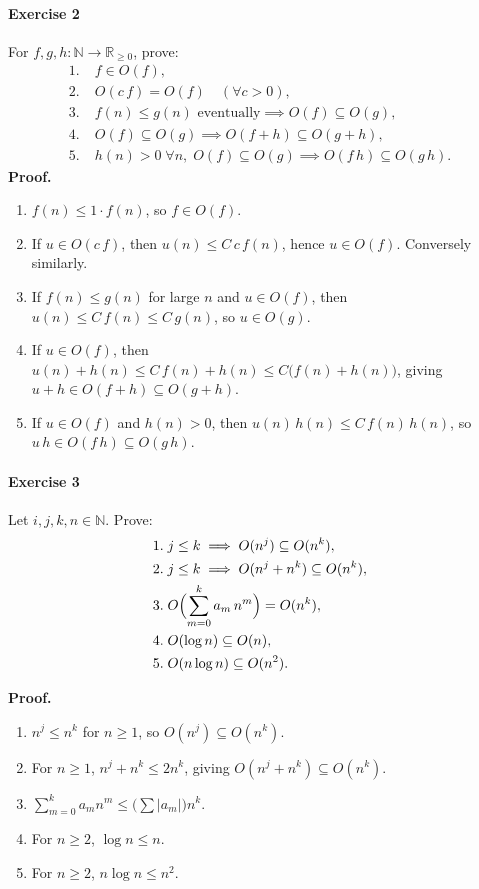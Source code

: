 \documentclass{article}
\theoremstyle{theorem}
\theoremstyle{definition}
\theoremstyle{remark}
\begin{document}
\paragraph*{Exercise 2}
For \(f,g,h\colon\mathbb N\to\mathbb R_{\ge0}\), prove:
\[
\begin{aligned}
1.\;&f\in O(f),\\
2.\;&O(c\,f)=O(f)\quad(\forall c>0),\\
3.\;&f(n)\le g(n)\text{ eventually}\implies O(f)\subseteq O(g),\\
4.\;&O(f)\subseteq O(g)\implies O(f+h)\subseteq O(g+h),\\
5.\;&h(n)>0\;\forall n,\;O(f)\subseteq O(g)\implies O(f\,h)\subseteq O(g\,h).
\end{aligned}
\]
\textbf{Proof.}
\begin{enumerate}[label=\arabic*.]
  \item \(f(n)\le1\cdot f(n)\), so \(f\in O(f)\).
  \item If \(u\in O(c\,f)\), then \(u(n)\le C\,c\,f(n)\), hence \(u\in O(f)\).  Conversely similarly.
  \item If \(f(n)\le g(n)\) for large \(n\) and \(u\in O(f)\), then \(u(n)\le C\,f(n)\le C\,g(n)\), so \(u\in O(g)\).
  \item If \(u\in O(f)\), then \(u(n)+h(n)\le C\,f(n)+h(n)\le C\bigl(f(n)+h(n)\bigr)\), giving \(u+h\in O(f+h)\subseteq O(g+h)\).
  \item If \(u\in O(f)\) and \(h(n)>0\), then \(u(n)\,h(n)\le C\,f(n)\,h(n)\), so \(u\,h\in O(f\,h)\subseteq O(g\,h)\).
\end{enumerate}

\paragraph*{Exercise 3}
Let \(i,j,k,n\in\mathbb N\). Prove:
\[
\begin{aligned}
1.\;&j\le k\implies O(n^j)\subseteq O(n^k),\\
2.\;&j\le k\implies O(n^j+n^k)\subseteq O(n^k),\\
3.\;&O\Bigl(\sum_{m=0}^k a_m\,n^m\Bigr)=O(n^k),\\
4.\;&O(\log n)\subseteq O(n),\\
5.\;&O(n\log n)\subseteq O(n^2).
\end{aligned}
\]

\newpage

\textbf{Proof.}
\begin{enumerate}[label=\arabic*.]
  \item \(n^j\le n^k\) for \(n\ge1\), so \(O(n^j)\subseteq O(n^k)\).
  \item For \(n\ge1\), \(n^j+n^k\le2n^k\), giving \(O(n^j+n^k)\subseteq O(n^k)\).
  \item \(\sum_{m=0}^k a_m n^m\le \bigl(\sum|a_m|\bigr)n^k\).
  \item For \(n\ge2\), \(\log n\le n\).
  \item For \(n\ge2\), \(n\log n\le n^2\).
\end{enumerate}
\end{document}
